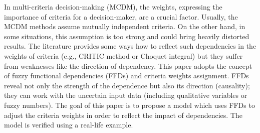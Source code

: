 
\begin{Abstrakt}
    In multi-criteria decision-making (MCDM), the weights, expressing the importance of criteria for a decision-maker, are a crucial factor. Usually, the MCDM methods assume mutually independent criteria. On the other hand, in some situations, this assumption is too strong and could bring heavily distorted results. The literature provides some ways how to reflect such dependencies in the weights of criteria (e.g., CRITIC method or Choquet integral) but they suffer from weaknesses like the direction of dependency. This paper adopts the concept of fuzzy functional dependencies (FFDs) and criteria weights assignment. FFDs reveal not only the strength of the dependence but also its direction (causality); they can work with the uncertain input data (including qualitative variables or fuzzy numbers). The goal of this paper is to propose a model which uses FFDs to adjust the criteria weights in order to reflect the impact of dependencies. The model is verified using a real-life example.
\end{Abstrakt}



\clearpage